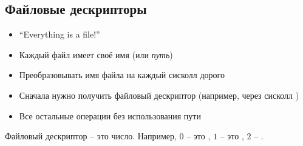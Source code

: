     \subsection{Файловые дескрипторы}
    \begin{itemize}
      \item ``Everything is a file!''
      \item Каждый файл имеет своё имя (или \textit{путь})
      \item Преобразовывать имя файла на каждый сисколл дорого
      \item Сначала нужно получить файловый дескриптор (например, через сисколл )
      \item Все остальные операции без использования пути
    \end{itemize}
    Файловый дескриптор -- это число. Например, $0$ -- это , $1$ -- это , $2$ -- .
